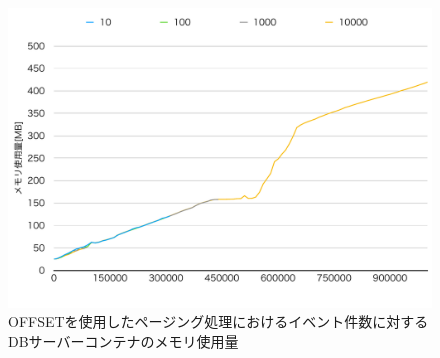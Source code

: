 \documentclass[../../../../../main]{subfiles}
\begin{document}
    \begin{figure}[H]
        \centering
        \includegraphics[width=12cm]{graph}
        \caption{OFFSETを使用したページング処理におけるイベント件数に対するDBサーバーコンテナのメモリ使用量}
        \label{fig:paging-offset-db-mem-app_1_1024-db_1_1024}
    \end{figure}
\end{document}
